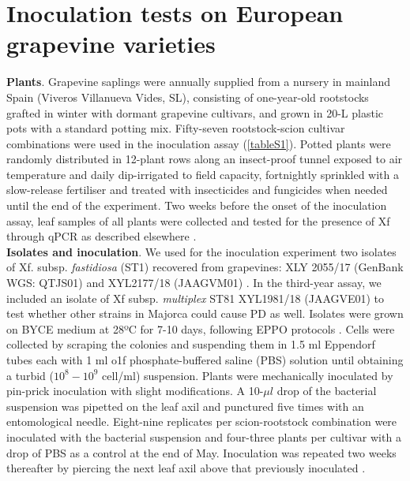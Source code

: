 \section{Inoculation tests on European grapevine
  varieties}\label{app:inoculations}

\textbf{Plants}. Grapevine saplings were annually supplied from a nursery in
mainland Spain (Viveros Villanueva Vides, SL), consisting of one-year-old
rootstocks grafted in winter with dormant grapevine cultivars, and grown in
20-L plastic pots with a standard potting mix. Fifty-seven rootstock-scion
cultivar combinations were used in the inoculation assay (\cref{tableS1}).
Potted plants were randomly distributed in 12-plant rows along an insect-proof
tunnel exposed to air temperature and daily dip-irrigated to field capacity,
fortnightly sprinkled with a slow-release fertiliser and treated with
insecticides and fungicides when needed until the end of the experiment. Two
weeks before the onset of the inoculation assay, leaf samples of all plants
were collected and tested for the presence of Xf through qPCR as described
elsewhere \cite{Moralejo2019}. \\

\noindent\textbf{Isolates and inoculation}. We used for the inoculation
experiment two isolates of Xf. subsp. \textit{fastidiosa} (ST1) recovered from
grapevines: XLY 2055/17 (GenBank WGS: QTJS01) and XYL2177/18 (JAAGVM01)
\cite{Gomila2019,Moralejo2020}. In the third-year assay, we included an isolate
of Xf subsp. \textit{multiplex} ST81 XYL1981/18 (JAAGVE01) to test whether
other strains in Majorca could cause PD as well. Isolates were grown on BYCE
medium at 28ºC for 7-10 days, following EPPO protocols \cite{EPPO2018}.  Cells
were collected by scraping the colonies and suspending them in 1.5 ml Eppendorf
tubes each with 1 ml o1f phosphate-buffered saline (PBS) solution until
obtaining a turbid ($10^8-10^9$ cell/ml) suspension. Plants were mechanically
inoculated by pin-prick inoculation \cite{Almeida2003} with slight
modifications. A 10-$\mu l$ drop of the bacterial suspension was pipetted on
the leaf axil and punctured five times with an entomological needle.
Eight-nine replicates per scion-rootstock combination were inoculated with the
bacterial suspension and four-three plants per cultivar with a drop of PBS as a
control at the end of May. Inoculation was repeated two weeks thereafter by
piercing the next leaf axil above that previously inoculated
\cite{Moralejo2019}.\\


